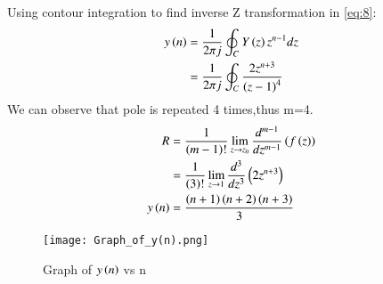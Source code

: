 \documentclass[journal,12pt,twocolumn]{IEEEtran}
\theoremstyle{remark}
\begin{document}
Using contour integration to find inverse Z transformation in \eqref{eq:8}:
\begin{align}
     y\left(n\right) & =  \frac{1}{2\pi j} \oint_C Y\left(z\right) z^{n-1} dz\label{eq:9}\\
   &=\frac{1}{2\pi j}\oint_{C}\frac{2z^{n+3}}{\left(z-1\right)^4}\label{eq:10}
\end{align}
We can observe that pole is repeated 4 times,thus m=4.
\begin{align}
 R&=\frac{1}{\left(m-1\right)!}\lim\limits_{z\to z_{0}}\frac{d^{m-1}}{dz^{m-1}}\left(f\left(z\right)\right)\label{eq:11}\\
 &=\frac{1}{\left(3\right)!}\lim\limits_{z\to 1}\frac{d^{3}}{dz^{3}}\left(2z^{n+3}\right)\label{eq:12}\\
 y\left(n\right)&=\frac{\left(n+1\right)\left(n+2\right)\left(n+3\right)}{3}\label{eq:13}
\end{align}
\begin{figure}[h]
        \centering
\texttt{[image: Graph\_of\_y(n).png]}
\caption{Graph of $y\left(n\right)$ vs n}
\label{fig:enter-label}
\end{figure}
\end{document}
